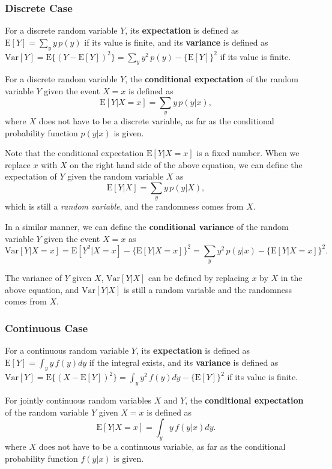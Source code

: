 \documentclass[]{book}
\theoremstyle{definition}
\theoremstyle{definition}
\theoremstyle{definition}
\theoremstyle{remark}
\begin{document}
\subsubsection{Discrete Case}\label{discrete-case-1}

For a discrete random variable \(Y\), its \textbf{expectation} is
defined as \(\mathrm{E}[Y]=\sum_y y\,p(y)\) if its value is finite, and
its \textbf{variance} is defined as
\(\mathrm{Var}[Y]=\mathrm{E}\{(Y-\mathrm{E}[Y])^2\}=\sum_y y^2\,p(y)-\{\mathrm{E}[Y]\}^2\)
if its value is finite.

For a discrete random variable \(Y\), the \textbf{conditional
expectation} of the random variable \(Y\) given the event \(X=x\) is
defined as \[\mathrm{E}[Y|X=x]=\sum_y y\,p(y|x),\] where \(X\) does not
have to be a discrete variable, as far as the conditional probability
function \(p(y|x)\) is given.

Note that the conditional expectation \(\mathrm{E}[Y|X=x]\) is a fixed
number. When we replace \(x\) with \(X\) on the right hand side of the
above equation, we can define the expectation of \(Y\) given the random
variable \(X\) as \[\mathrm{E}[Y|X]=\sum_y y\,p(y|X),\] which is still a
\emph{random variable}, and the randomness comes from \(X\).

In a similar manner, we can define the \textbf{conditional variance} of
the random variable \(Y\) given the event \(X=x\) as
\[\mathrm{Var}[Y|X=x]=\mathrm{E}[Y^2|X=x]-\{\mathrm{E}[Y|X=x]\}^2=\sum_y y^2\,p(y|x)-\{\mathrm{E}[Y|X=x]\}^2.\]

The variance of \(Y\) given \(X\), \(\mathrm{Var}[Y|X]\) can be defined
by replacing \(x\) by \(X\) in the above equation, and
\(\mathrm{Var}[Y|X]\) is still a random variable and the randomness
comes from \(X\).

\subsubsection{Continuous Case}\label{continuous-case-1}

For a continuous random variable \(Y\), its \textbf{expectation} is
defined as \(\mathrm{E}[Y]=\int_y y\,f(y)dy\) if the integral exists,
and its \textbf{variance} is defined as
\(\mathrm{Var}[Y]=\mathrm{E}\{(X-\mathrm{E}[Y])^2\}=\int_y y^2\,f(y)dy-\{\mathrm{E}[Y]\}^2\)
if its value is finite.

For jointly continuous random variables \(X\) and \(Y\), the
\textbf{conditional expectation} of the random variable \(Y\) given
\(X=x\) is defined as \[\mathrm{E}[Y|X=x]=\int_y y\,f(y|x)dy.\] where
\(X\) does not have to be a continuous variable, as far as the
conditional probability function \(f(y|x)\) is given.
\end{document}
